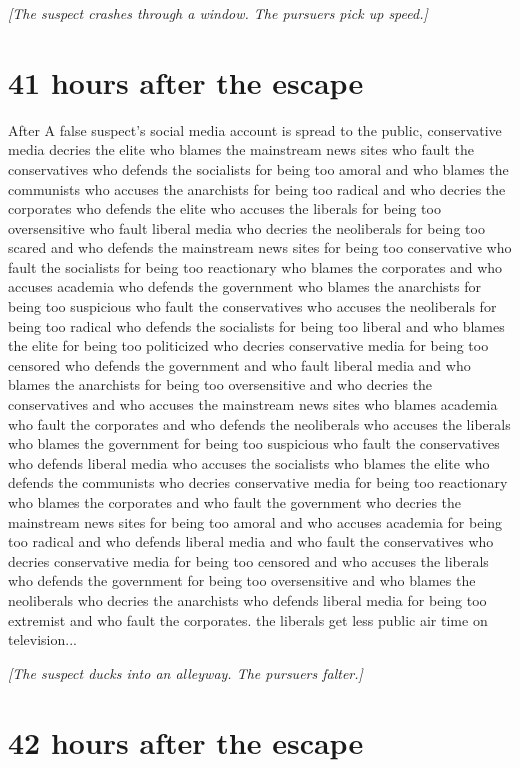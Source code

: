 \documentclass{report}
\begin{document}
\textit{[The suspect crashes through a window. The pursuers pick up speed.]}


\section*{41 \small{hours after the escape}}

After A false suspect's social media account is spread to the public, conservative media decries the elite who blames the mainstream news sites who fault the conservatives who defends the socialists for being too amoral and who blames the communists who accuses the anarchists for being too radical and who decries the corporates who defends the elite who accuses the liberals for being too oversensitive who fault liberal media who decries the neoliberals for being too scared and who defends the mainstream news sites for being too conservative who fault the socialists for being too reactionary who blames the corporates and who accuses academia who defends the government who blames the anarchists for being too suspicious who fault the conservatives who accuses the neoliberals for being too radical who defends the socialists for being too liberal and who blames the elite for being too politicized who decries conservative media for being too censored who defends the government and who fault liberal media and who blames the anarchists for being too oversensitive and who decries the conservatives and who accuses the mainstream news sites who blames academia who fault the corporates and who defends the neoliberals who accuses the liberals who blames the government for being too suspicious who fault the conservatives who defends liberal media who accuses the socialists who blames the elite who defends the communists who decries conservative media for being too reactionary who blames the corporates and who fault the government who decries the mainstream news sites for being too amoral and who accuses academia for being too radical and who defends liberal media and who fault the conservatives who decries conservative media for being too censored and who accuses the liberals who defends the government for being too oversensitive and who blames the neoliberals who decries the anarchists who defends liberal media for being too extremist and who fault the corporates. the liberals get less public air time on television...

\textit{[The suspect ducks into an alleyway. The pursuers falter.]}


\section*{42 \small{hours after the escape}}
\end{document}
